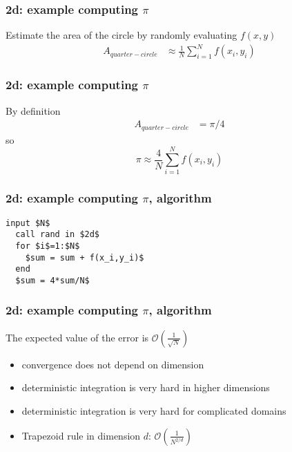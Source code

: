 \documentclass[10pt]{beamer}
\newcommand{\mO}{{\mathcal{O}}}
\begin{document}
\begin{frame}
\frametitle{2d: example computing $\pi$}
Estimate the area of the circle by randomly evaluating $f(x,y)$
\begin{align*}
  A_{quarter-circle} &\approx \frac{1}{N}\sum_{i=1}^{N}f(x_i,y_i)
\end{align*}
\begin{center}
\end{center}
\end{frame}
\begin{frame}
\frametitle{2d: example computing $\pi$}
By definition
\begin{align*}
  A_{quarter-circle} & = \pi/4
\end{align*}
so
\begin{equation*}
  \pi \approx \frac{4}{N} \sum_{i=1}^{N}f(x_i,y_i)
\end{equation*}
\end{frame}
\begin{frame}[fragile]
\frametitle{2d: example computing $\pi$, algorithm}
\begin{lstlisting}[mathescape]
  input $N$
  call rand in $2d$
  for $i$=1:$N$
    $sum = sum + f(x_i,y_i)$
  end
  $sum = 4*sum/N$
\end{lstlisting}
\end{frame}
\begin{frame}
\frametitle{2d: example computing $\pi$, algorithm}
The expected value of the error is $\mO(\frac{1}{\sqrt{N}})$
\begin{itemize}
  \item convergence does not depend on dimension
  \item deterministic integration is very hard in higher dimensions
  \item deterministic integration is very hard for complicated domains
    \item Trapezoid rule in dimension $d$: $\mO(\frac{1}{N^{2/d}})$
\end{itemize}
\end{frame}
\end{document}
